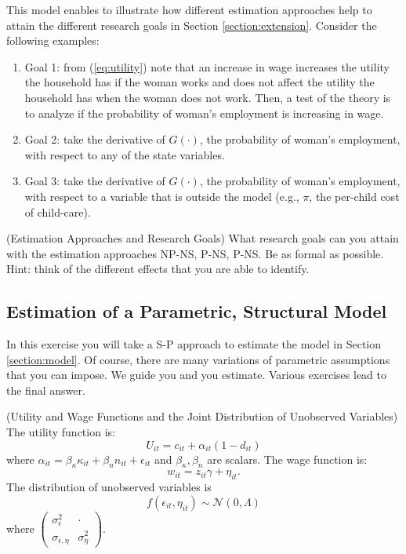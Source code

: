 \indent This model enables to illustrate how different estimation approaches help to attain the different research goals in Section \ref{section:extension}. Consider the following examples:
\begin{enumerate}
\item Goal 1: from (\ref{eq:utility}) note that an increase in wage increases the utility the household has if the woman works and does not affect the utility the household has when the woman does not work. Then, a test of the theory is to analyze if the probability of woman's employment is increasing in wage. 
\item Goal 2: take the derivative of $G(\cdot)$, the probability of woman's employment, with respect to any of the state variables.
\item Goal 3: take the derivative of $G(\cdot)$, the probability of woman's employment, with respect to a variable that is outside the model (e.g., $\pi$, the per-child cost of child-care). 
\end{enumerate}

\begin{exercise} (Estimation Approaches and Research Goals) \label{exercise:approaches}
What research goals can you attain with the estimation approaches NP-NS, P-NS, P-NS. Be as formal as possible. Hint: think of the different effects that you are able to identify.
\end{exercise}

\subsection{Estimation of a Parametric, Structural Model}
In this exercise you will take a S-P approach to estimate the model in Section \ref{section:model}. Of course, there are many variations of parametric assumptions that you can impose. We guide you and you estimate. Various exercises lead to the final answer. 

\begin{assumption} (Utility and Wage Functions and the Joint Distribution of Unobserved Variables) \label{assumption:utwajo}
The utility function is:
\begin{equation}
U_{it} = c_{it} + \alpha_{it} (1 - d_{it})
\end{equation}
\noindent where $\alpha_{it} = \beta_{\kappa} \kappa_{it} + \beta_{n} n_{it} + \epsilon_{it}$ and $\beta_{\kappa},\beta_{n}$ are scalars. The wage function is:
\begin{equation}
w_{it} = z_{it} \gamma + \eta_{it}.
\end{equation}
\noindent The distribution of unobserved variables is
\begin{equation}
f \left( \epsilon_{it}, \eta_{it} \right) \sim \mathcal{N} \left( 0, \Lambda \right)
\end{equation}
where $\left( \begin{array}{cc} 
\sigma_{\epsilon}^2 & \cdot \\
\sigma_{\epsilon, \eta} & \sigma_{\eta}^2
\end{array} \right)$.  
\end{assumption}

